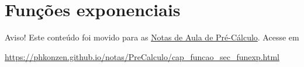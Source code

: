




\section{Funções exponenciais}\label{cap_funcao_sec_funexp}

\begin{center}
  Aviso! Este conteúdo foi movido para as \href{https://phkonzen.github.io/notas/PreCalculo/main.html}{Notas de Aula de Pré-Cálculo}. Acesse em

  \url{https://phkonzen.github.io/notas/PreCalculo/cap_funcao_sec_funexp.html}
\end{center}

